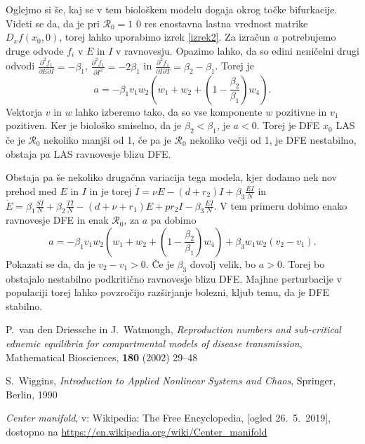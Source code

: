 \documentclass[a4paper,12pt]{article}
\newcommand{\R}{\mathcal R}
\begin{document}
Oglejmo si še, kaj se v tem biološkem modelu dogaja okrog točke bifurkacije. 
Videti se da, da je pri \(\R_0=1\) \(0\) res enostavna lastna vrednost matrike 
\(D_xf(x_0,0)\), torej lahko uporabimo izrek \ref{izrek2}. Za izračun \(a\) potrebujemo 
druge odvode \(f_i\) v \(E\) in \(I\) v ravnovesju. Opazimo lahko, da so edini neničelni drugi odvodi
\(\frac{\partial^2f_1}{\partial E \partial I}=-\beta_1\), 
\(\frac{\partial^2f_1}{\partial I^2}=-2\beta_1\) in 
\(\frac{\partial^2f_1}{\partial I \partial T}=\beta_2-\beta_1\). 
Torej je \[a=-\beta_1 v_1 w_2(w_1+w_2+(1-\frac{\beta_2}{\beta_1})w_4).\]
Vektorja \(v\) in \(w\) lahko izberemo tako, da so vse komponente \(w\) pozitivne 
in \(v_1\) pozitiven. Ker je biološko smiselno, da je \(\beta_2<\beta_1\), je \(a<0\). 
Torej je DFE \(x_0\) LAS če je \(\R_0\) nekoliko manjši od 1, če pa je \(\R_0\) nekoliko večji od 1,
je DFE nestabilno, obstaja pa LAS ravnovesje blizu DFE. 

Obstaja pa še nekoliko drugačna variacija tega modela, kjer dodamo 
nek nov prehod med \(E\) in \(I\) in je torej 
\(\dot{I}=\nu E -(d+r_2)I +\beta_3 \frac{EI}{N}\) in \(\dot{E}= \beta_1\frac{SI}{N}+\beta_2\frac{TI}{N}-(d+\nu+r_1)E+pr_2I-\beta_3 \frac{EI}{N}\).
V tem primeru dobimo enako ravnovesje DFE in enak \(\R_0\), za \(a\) pa dobimo 
\[a=-\beta_1v_1w_2(w_1+w_2+(1-\frac{\beta_2}{\beta_1})w_4)+\beta_3w_1w_2(v_2-v_1).\]
Pokazati se da, da je \(v_2-v_1>0\). Če je \(\beta_3\) dovolj velik, bo \(a>0\). 
Torej bo obstajalo nestabilno podkritično ravnovesje blizu DFE. Majhne perturbacije v populaciji 
torej lahko povzročijo razširjanje bolezni, kljub temu, da je DFE stabilno.

\begin{thebibliography}{99}

    P.~van den Driessche in J.~Watmough, \emph{Reproduction numbers and sub-critical ednemic equilibria for compartmental models of disease transmission}, 
    Mathematical Biosciences, \textbf{180} (2002) 29--48
    
    S.~Wiggins, \emph{Introduction to Applied Nonlinear Systems and Chaos}, Springer, Berlin, 1990

    \emph{Center manifold}, v: Wikipedia: The Free Encyclopedia, [ogled 26.~5.~2019], dostopno na \url{https://en.wikipedia.org/wiki/Center_manifold}
\end{thebibliography}
\end{document}
